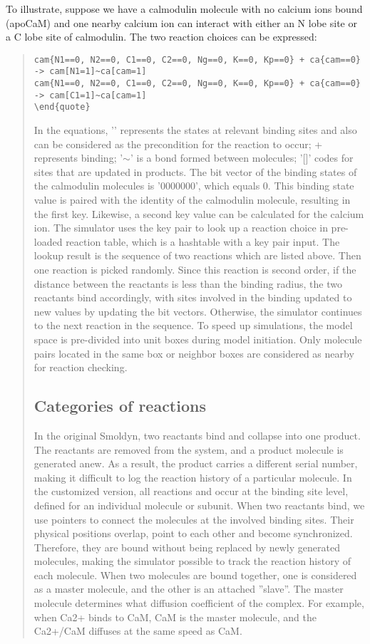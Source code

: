 To illustrate, suppose we have a calmodulin molecule with no calcium ions bound (apoCaM) and one nearby calcium ion can interact with either an N lobe site or a C lobe site of calmodulin. The two reaction choices can be expressed:
\begin{quote}
\begin{verbatim}
cam{N1==0, N2==0, C1==0, C2==0, Ng==0, K==0, Kp==0} + ca{cam==0} -> cam[N1=1]~ca[cam=1]
cam{N1==0, N2==0, C1==0, C2==0, Ng==0, K==0, Kp==0} + ca{cam==0} -> cam[C1=1]~ca[cam=1]
\end{quote}
\end{verbatim}
In the equations, '{}' represents the states at relevant binding sites and also can be considered as the precondition for the reaction to occur; + represents binding; '$\sim$' is a bond formed between molecules; '[]' codes for sites that are updated in products. The bit vector of the binding states of the calmodulin molecules is ’0000000’, which equals 0. This binding state value is paired with the identity of the calmodulin molecule, resulting in the first key. Likewise, a second key value can be calculated for the calcium ion. The simulator uses the key pair to look up a reaction choice in pre-loaded reaction table, which is a hashtable with a key pair input. The lookup result is the sequence of two reactions which are listed above. Then one reaction is picked randomly. Since this reaction is second order, if the distance between the reactants is less than the binding radius, the two reactants bind accordingly, with sites involved in the binding updated to new values by updating the bit vectors. Otherwise, the simulator continues to the next reaction in the sequence. To speed up simulations, the model space is pre-divided into unit boxes during model initiation. Only molecule pairs located in the same box or neighbor boxes are considered as nearby for reaction checking.


\subsection{Categories of reactions}
In the original Smoldyn, two reactants bind and collapse into one product. The reactants are removed from the system, and a product molecule is generated anew. As a result, the product carries a different serial number, making it difficult to log the reaction history of a particular molecule. In the customized version, all reactions and occur at the binding site level, defined for an individual molecule or subunit. When two reactants bind, we use pointers to connect the molecules at the involved binding sites. Their physical positions overlap, point to each other and become synchronized. Therefore, they are bound without being replaced by newly generated molecules, making the simulator possible to track the reaction history of each molecule. When two molecules are bound together, one is considered as a master molecule, and the other is an attached ”slave”. The master molecule determines what diffusion coefficient of the complex. For example, when Ca2+ binds to CaM, CaM is the master molecule, and the Ca2+/CaM diffuses at the same speed as CaM.


\end{quote}

